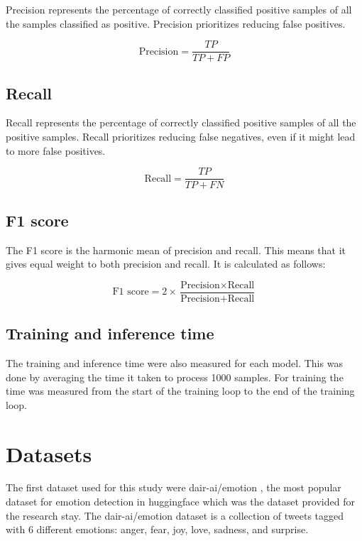 Precision represents the percentage of correctly classified positive samples of
all the samples classified as positive. Precision prioritizes reducing false
positives.

\begin{equation}
    \text{Precision} = \frac{TP}{TP + FP}
\end{equation}

\subsection{Recall}

Recall represents the percentage of correctly classified positive samples of
all the positive samples. Recall prioritizes reducing false negatives, even if
it might lead to more false positives.

\begin{equation}
    \text{Recall} = \frac{TP}{TP + FN}
\end{equation}

\subsection{F1 score}

The F1 score is the harmonic mean of precision and recall. This means that it
gives equal weight to both precision and recall. It is calculated as follows:

\begin{equation}
    \text{F1 score} = 2 \times \frac{\text{Precision} \times
        \text{Recall}}{\text{Precision} + \text{Recall}}
\end{equation}

\subsection{Training and inference time}

The training and inference time were also measured for each model. This was
done by averaging the time it taken to process 1000 samples. For training the
time was measured from the start of the training loop to the end of the training
loop.

\section{Datasets}

The first dataset used for this study were dair-ai/emotion
\cite{saravia-etal-2018-carer}, the most popular dataset for emotion detection
in huggingface which was the dataset provided for the research stay.
The dair-ai/emotion dataset is a collection of tweets tagged with 6 different
emotions: anger, fear, joy, love, sadness, and surprise.

